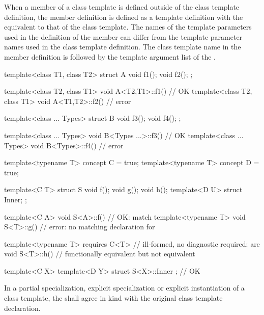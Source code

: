\pnum
\begin{note}
When a member of a class
template is defined outside of the class template definition,
the member definition is defined as a template definition with the
 equivalent to that
of the class template.
The names of the template parameters used in the definition of the member
can differ from the template parameter names used in the class
template definition.
The class template name in the member definition is followed by
the template argument list of the .
\begin{example}
\begin{codeblock}
template<class T1, class T2> struct A {
  void f1();
  void f2();
};

template<class T2, class T1> void A<T2,T1>::f1() { }    // OK
template<class T2, class T1> void A<T1,T2>::f2() { }    // error
\end{codeblock}

\begin{codeblock}
template<class ... Types> struct B {
  void f3();
  void f4();
};

template<class ... Types> void B<Types ...>::f3() { }   // OK
template<class ... Types> void B<Types>::f4() { }       // error
\end{codeblock}

\begin{codeblock}
template<typename T> concept C = true;
template<typename T> concept D = true;

template<C T> struct S {
  void f();
  void g();
  void h();
  template<D U> struct Inner;
};

template<C A> void S<A>::f() { }        // OK:  match
template<typename T> void S<T>::g() { } // error: no matching declaration for 

template<typename T> requires C<T>      // ill-formed, no diagnostic required:  are
void S<T>::h() { }                      // functionally equivalent but not equivalent

template<C X> template<D Y>
struct S<X>::Inner { };                 // OK
\end{codeblock}
\end{example}
\end{note}

\pnum
In a partial specialization,
explicit specialization or
explicit instantiation of a class template,
the 
shall agree in kind with the original class template declaration.

